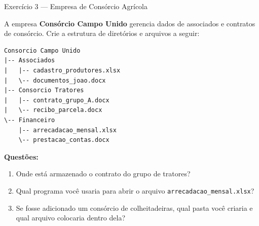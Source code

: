 \documentclass[12pt]{article}
\begin{document}
\begin{block}{Exercício 3 --- Empresa de Consórcio Agrícola}

A empresa \textbf{Consórcio Campo Unido} gerencia dados de associados e contratos de consórcio. Crie a estrutura de diretórios e arquivos a seguir:

\begin{verbatim}
Consorcio Campo Unido
|-- Associados
|   |-- cadastro_produtores.xlsx
|   \-- documentos_joao.docx
|-- Consorcio Tratores
|   |-- contrato_grupo_A.docx
|   \-- recibo_parcela.docx
\-- Financeiro
    |-- arrecadacao_mensal.xlsx
    \-- prestacao_contas.docx
\end{verbatim}

\textbf{Questões:}
\begin{enumerate}[label=\alph*)]
    \item Onde está armazenado o contrato do grupo de tratores?
    \item Qual programa você usaria para abrir o arquivo \texttt{arrecadacao\_mensal.xlsx}?
    \item Se fosse adicionado um consórcio de colheitadeiras, qual pasta você criaria e qual arquivo colocaria dentro dela?
\end{enumerate}

\end{block}

\end{document}
